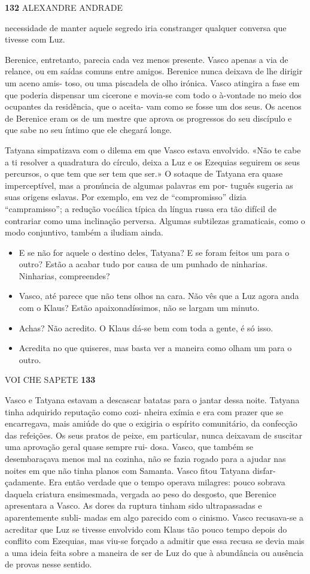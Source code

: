 \textbf{132 }ALEXANDRE ANDRADE

necessidade de manter aquele segredo iria constranger qualquer conversa
que tivesse com Luz.

Berenice, entretanto, parecia cada vez menos presente. Vasco apenas a
via de relance, ou em saídas comuns entre amigos. Berenice nunca deixava
de lhe dirigir um aceno amis- toso, ou uma piscadela de olho irónica.
Vasco atingira a fase em que poderia dispensar um cicerone e movia-se
com todo o à-vontade no meio dos ocupantes da residência, que o aceita-
vam como se fosse um dos seus. Os acenos de Berenice eram os de um
mestre que aprova os progressos do seu discípulo e que sabe no seu
íntimo que ele chegará longe.

Tatyana simpatizava com o dilema em que Vasco estava envolvido. «Não te
cabe a ti resolver a quadratura do círculo, deixa a Luz e os Ezequias
seguirem os seus percursos, o que tem que ser tem que ser.» O sotaque de
Tatyana era quase imperceptível, mas a pronúncia de algumas palavras em
por- tuguês sugeria as suas origens eslavas. Por exemplo, em vez de
``compromisso'' dizia ``campramisso''; a redução vocálica típica da
língua russa era tão difícil de contrariar como uma inclinação perversa.
Algumas subtilezas gramaticais, como o modo conjuntivo, também a iludiam
ainda.

\begin{itemize}
\tightlist
\item
  E se não for aquele o destino deles, Tatyana? E se foram feitos um
  para o outro? Estão a acabar tudo por causa de um punhado de
  ninharias. Ninharias, compreendes?
\item
  Vasco, até parece que não tens olhos na cara. Não vês que a Luz agora
  anda com o Klaus? Estão apaixonadíssimos, não se largam um minuto.
\item
  Achas? Não acredito. O Klaus dá-se bem com toda a gente, é só isso.
\item
  Acredita no que quiseres, mas basta ver a maneira como olham um para o
  outro.
\end{itemize}

VOI CHE SAPETE \textbf{133}

Vasco e Tatyana estavam a descascar batatas para o jantar dessa noite.
Tatyana tinha adquirido reputação como cozi- nheira exímia e era com
prazer que se encarregava, mais amiúde do que o exigiria o espírito
comunitário, da confecção das refeições. Os seus pratos de peixe, em
particular, nunca deixavam de suscitar uma aprovação geral quase sempre
rui- dosa. Vasco, que também se desembaraçava menos mal na cozinha, não
se fazia rogado para a ajudar nas noites em que não tinha planos com
Samanta. Vasco fitou Tatyana disfar- çadamente. Era então verdade que o
tempo operava milagres: pouco sobrava daquela criatura ensimesmada,
vergada ao peso do desgosto, que Berenice apresentara a Vasco. As dores
da ruptura tinham sido ultrapassadas e aparentemente subli- madas em
algo parecido com o cinismo. Vasco recusava-se a acreditar que Luz se
tivesse envolvido com Klaus tão pouco tempo depois do conflito com
Ezequias, mas viu-se forçado a admitir que essa recusa se devia mais a
uma ideia feita sobre a maneira de ser de Luz do que à abundância ou
ausência de provas nesse sentido.

